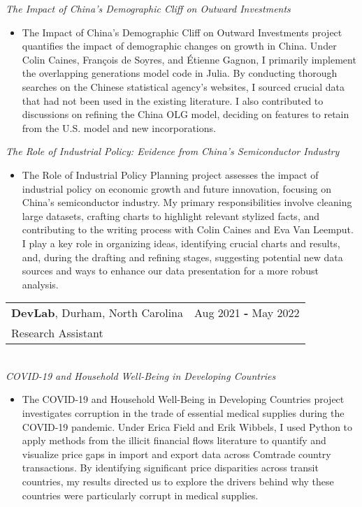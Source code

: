\documentclass[letterpaper,11pt]{article}
\makeatletter
\newcommand{\Item}[1]{
  \item\small{
    {#1 \vspace{-2pt}}
  }
}
\newcommand{\Subheading}[4]{
  \vspace{-2pt}\item
    \begin{tabular*}{0.97\textwidth}[t]{l@{\extracolsep{\fill}}r}
      \textbf{#1}, #2 & #3 \\
      \small#4 \\
    \end{tabular*}\\
}
\newcommand{\ItemListStart}{\begin{itemize}}
\newcommand{\ItemListEnd}{\end{itemize}}
\newcommand{\ProjectTitle}[1]{\textit{\small #1} \vspace{-7pt}}
\makeatother
\begin{document}
      \vspace{0.4cm}

      \ProjectTitle{The Impact of China's Demographic Cliff on Outward Investments}
        \ItemListStart
          \Item{The Impact of China's Demographic Cliff on Outward Investments 
            project quantifies the impact of demographic changes on growth in 
            China. Under Colin Caines, Fran\c{c}ois de Soyres, and \'{E}tienne 
            Gagnon, I primarily implement the overlapping generations model 
            code in Julia. By conducting thorough searches on the Chinese 
            statistical agency's websites, I sourced crucial data that had not 
            been used in the existing literature. I also contributed to 
            discussions on refining the China OLG model, deciding on features 
            to retain from the U.S. model and new incorporations.}
        \ItemListEnd

      \ProjectTitle{The Role of Industrial Policy: Evidence from China's Semiconductor Industry}
        \ItemListStart
          \Item{The Role of Industrial Policy Planning project assesses the 
            impact of industrial policy on economic growth and future 
            innovation, focusing on China's semiconductor industry. My primary 
            responsibilities involve cleaning large datasets, crafting charts 
            to highlight relevant stylized facts, and contributing to the 
            writing process with Colin Caines and Eva Van Leemput. I play a key 
            role in organizing ideas, identifying crucial charts and results, 
            and, during the drafting and refining stages, suggesting potential 
            new data sources and ways to enhance our data presentation for a 
            more robust analysis. }
        \ItemListEnd
    
    \Subheading
    {DevLab}{Durham, North Carolina}{Aug 2021 \textbf{-} May 2022}
    {Research Assistant}
      \ProjectTitle{COVID-19 and Household Well-Being in Developing Countries}
      \ItemListStart
        \Item{The COVID-19 and Household Well-Being in Developing Countries 
          project investigates corruption in the trade of essential medical 
          supplies during the COVID-19 pandemic. Under Erica Field and Erik 
          Wibbels, I used Python to apply methods from the illicit financial 
          flows literature to quantify and visualize price gaps in import and 
          export data across Comtrade country transactions. By identifying 
          significant price disparities across transit countries, my results 
          directed us to explore the drivers behind why these countries were 
          particularly corrupt in medical supplies. }
      \ItemListEnd
\end{document}
